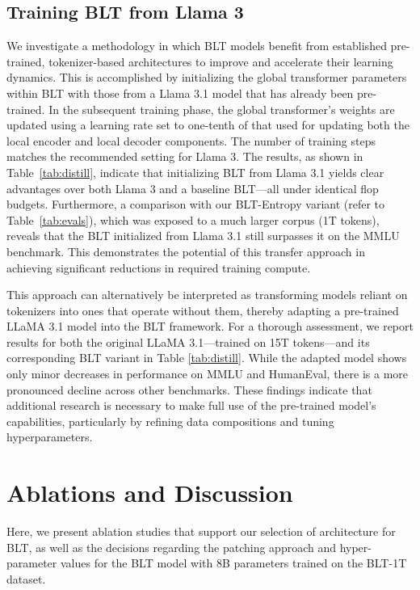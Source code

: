 \subsection{Training {\textsc BLT} from Llama 3}
\label{sec:distillation}
We investigate a methodology in which {\textsc BLT} models benefit from established pre-trained, tokenizer-based architectures to improve and accelerate their learning dynamics. This is accomplished by initializing the global transformer parameters within {\textsc BLT} with those from a Llama 3.1 model that has already been pre-trained. In the subsequent training phase, the global transformer’s weights are updated using a learning rate set to one-tenth of that used for updating both the local encoder and local decoder components. The number of training steps matches the recommended setting for Llama 3. The results, as shown in Table~\ref{tab:distill}, indicate that initializing {\textsc BLT} from Llama 3.1 yields clear advantages over both Llama 3 and a baseline {\textsc BLT}—all under identical flop budgets. Furthermore, a comparison with our {\textsc BLT}-Entropy variant (refer to Table~\ref{tab:evals}), which was exposed to a much larger corpus (1T tokens), reveals that the {\textsc BLT} initialized from Llama 3.1 still surpasses it on the MMLU benchmark. This demonstrates the potential of this transfer approach in achieving significant reductions in required training compute.

This approach can alternatively be interpreted as transforming models reliant on tokenizers into ones that operate without them, thereby adapting a pre-trained LLaMA 3.1 model into the {\textsc BLT} framework. For a thorough assessment, we report results for both the original LLaMA 3.1—trained on 15T tokens—and its corresponding {\textsc BLT} variant in Table \ref{tab:distill}. While the adapted model shows only minor decreases in performance on MMLU and HumanEval, there is a more pronounced decline across other benchmarks. These findings indicate that additional research is necessary to make full use of the pre-trained model’s capabilities, particularly by refining data compositions and tuning hyperparameters.

\section{Ablations and Discussion}
\label{section:ablations}
Here, we present ablation studies that support our selection of architecture for {\textsc BLT}, as well as the decisions regarding the patching approach and hyper-parameter values for the {\textsc BLT} model with 8B parameters trained on the {\textsc BLT}-1T dataset.

